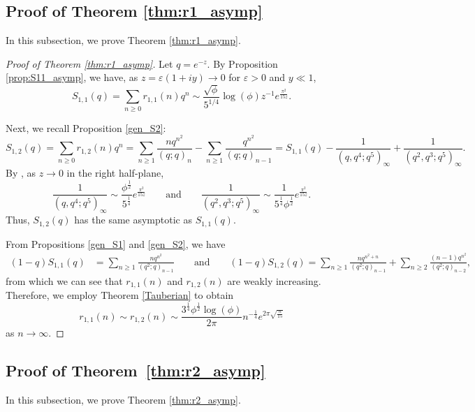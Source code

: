 \documentclass[11pt,reqno]{amsart}
\theoremstyle{remark}
\numberwithin{equation}{section}
\begin{document}
 
\subsection{Proof of Theorem \ref{thm:r1_asymp}}\label{sec:r1_asymp}
In this subsection, we prove Theorem \ref{thm:r1_asymp}.
 
\begin{proof}[Proof of Theorem \ref{thm:r1_asymp}]
Let $q=e^{-z}$. By Proposition \ref{prop:S11_asymp}, we have, as $z=\varepsilon(1+iy) \to 0$ for $\varepsilon>0$ and $y \ll 1$,  
\[
	S_{1,1}(q) =\sum_{n\ge 0} r_{1,1}(n) q^n \sim \frac{\sqrt{\phi} }{5^{1/4}}\log(\phi)  z^{-1} e^{\frac{\pi^2}{15 z}}.
\]


Next, we recall Proposition \ref{gen_S2}:
\[
	S_{1,2}(q)=\sum_{n\ge 0} r_{1,2}(n) q^n  =\sum_{n\ge 1} \frac{nq^{n^2}}{(q;q)_n} - \sum_{n\ge 1} \frac{ q^{n^2}}{(q;q)_{n-1}} 
	= S_{1,1}(q) - \frac{1}{(q,q^4;q^5)_\infty} + \frac{1}{(q^2,q^3;q^5)_\infty}.
\]
By \cite[Corollary 1.4]{K}, as $z \to 0$ in the right half-plane,
\[
	\frac{1}{(q,q^4;q^5)_\infty} \sim \frac{\phi^{\frac12}}{5^{\frac14}}e^{\frac{\pi^2}{15z}} \qquad \text{and} \qquad
	\frac{1}{(q^2,q^3;q^5)_\infty} \sim \frac{1}{5^{\frac14}\phi^{\frac12}}e^{\frac{\pi^2}{15z}}.
\]
Thus, $S_{1,2}(q)$ has the same asymptotic as $S_{1,1}(q)$.


From Propositions \ref{gen_S1} and \ref{gen_S2}, we have
\begin{align*}
	(1-q)S_{1,1}(q) &= \sum_{n\ge 1} \frac{nq^{n^2}}{(q^2;q)_{n-1}} \qquad \text{and}\qquad (1-q)S_{1,2}(q) = \sum_{n\ge 1 } \frac{ n q^{n^2+n}}{(q^2;q)_{n-1}} + \sum_{n\ge 2} \frac{ (n-1) q^{n^2}}{(q^2;q)_{n-2}},
\end{align*}
from which we can see that $r_{1,1}(n)$ and $r_{1,2}(n)$ are weakly increasing. Therefore, we employ Theorem \ref{Tauberian} to obtain
\[
	r_{1,1}(n) \sim r_{1,2}(n) \sim \frac{3^{\frac14} \phi^{\frac12}  \log(\phi) }{2 \pi} n^{-\frac14}e^{2\pi \sqrt{\frac{n}{15}}}
\]
as $n \to \infty$.
\end{proof} 
 
 
\subsection{Proof of Theorem~\ref{thm:r2_asymp}} \label{sec:r2_asymp}
In this subsection, we prove Theorem \ref{thm:r2_asymp}.
\end{document}
